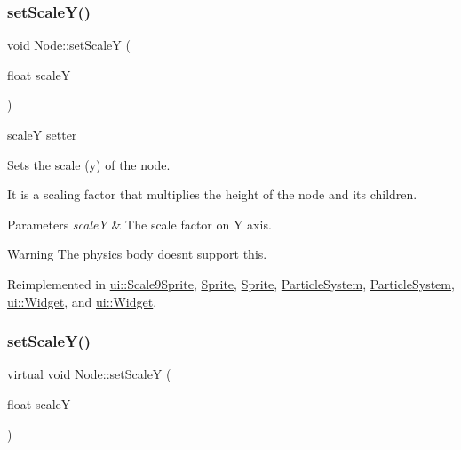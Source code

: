 \mbox{\label{classNode_aec805a1fa9e8e1038556e468138bb804}} 
\subsubsection{\texorpdfstring{set\+Scale\+Y()}{setScaleY()}\hspace{0.1cm}{\footnotesize\ttfamily [1/2]}}
{\footnotesize\ttfamily void Node\+::set\+ScaleY (\begin{DoxyParamCaption}\item[{float}]{scaleY }\end{DoxyParamCaption})\hspace{0.3cm}{\ttfamily [virtual]}}



scaleY setter 

Sets the scale (y) of the node.

It is a scaling factor that multiplies the height of the node and its children.


\begin{DoxyParams}{Parameters}
{\em scaleY} & The scale factor on Y axis.\\
\hline
\end{DoxyParams}
\begin{DoxyWarning}{Warning}
The physics body doesn\textquotesingle{}t support this. 
\end{DoxyWarning}


Reimplemented in \hyperlink{classui_1_1Scale9Sprite_a7c108e20a3b0b479258447335531bfe2}{ui\+::\+Scale9\+Sprite}, \hyperlink{classSprite_ab7e7db21d5cd13269074fde7195fa3e2}{Sprite}, \hyperlink{classSprite_a167e418b057071cbaf57f75f7c88c9df}{Sprite}, \hyperlink{classParticleSystem_a1e6720f314dfec3f5b7ca02c305ea28e}{Particle\+System}, \hyperlink{classParticleSystem_a3b3ba015dde4abcf804692cacef4f575}{Particle\+System}, \hyperlink{classui_1_1Widget_a8d68ee46f555dc23b8fcec84542eadcc}{ui\+::\+Widget}, and \hyperlink{classui_1_1Widget_acac2f88e6a4fb013377bc981a4a10c57}{ui\+::\+Widget}.

\mbox{\label{classNode_af464e6b40bc036450fed05f8c74103e7}} 
\subsubsection{\texorpdfstring{set\+Scale\+Y()}{setScaleY()}\hspace{0.1cm}{\footnotesize\ttfamily [2/2]}}
{\footnotesize\ttfamily virtual void Node\+::set\+ScaleY (\begin{DoxyParamCaption}\item[{float}]{scaleY }\end{DoxyParamCaption})\hspace{0.3cm}{\ttfamily [virtual]}}

